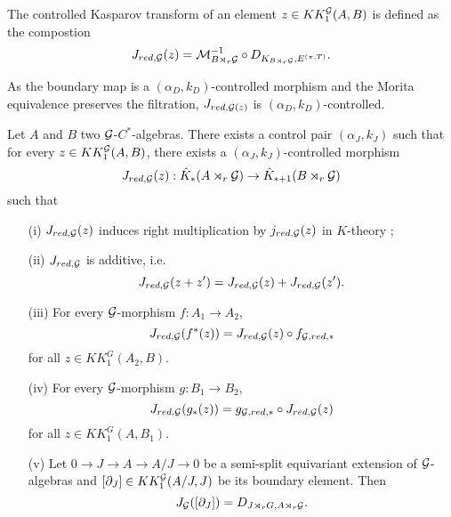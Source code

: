 \begin{definition}
The controlled Kasparov transform of an element $z\in KK_1^\mathcal G(A,B)$ is defined as the compostion
\[J_{red,\mathcal G}(z)=\mathcal M_{B\rtimes_r \mathcal G}^{-1}\circ D_{K_{B\rtimes_r \mathcal G}, E^{(\pi,T)}}.\]
\end{definition}

As the boundary map is a $(\alpha_D,k_D)$-controlled morphism and the Morita equivalence preserves the filtration, $J_{red,\mathcal G(z)}$ is  $(\alpha_D,k_D)$-controlled. 

\begin{prop}\label{Kasparov1}
Let $A$ and $B$ two $\mathcal G$-$C^*$-algebras. There exists a control pair $(\alpha_J,k_J)$ such that for every $z\in KK^\mathcal G_1(A,B)$, there exists a $(\alpha_J,k_J)$-controlled morphism
\[J_{red,\mathcal G}(z) : \hat K_*(A\rtimes_r \mathcal G)\rightarrow \hat K_{*+1}(B\rtimes_r \mathcal G)\]
such that
\begin{enumerate}
\item[(i)] $J_{red,\mathcal G}(z)$ induces right multiplication by $j_{red,\mathcal G}(z)$ in $K$-theory ;
\item[(ii)] $J_{red,\mathcal G}$ is additive, i.e.
\[J_{red,\mathcal G}(z+z')=J_{red,\mathcal G}(z)+J_{red,\mathcal G}(z').\]
\item[(iii)] For every $\mathcal G$-morphism $f : A_1\rightarrow A_2$,
\[J_{red,\mathcal G}(f^*(z))=J_{red,\mathcal G}(z)\circ f_{\mathcal G,red,*}\] for all $z\in KK_1^G(A_2,B)$.
\item[(iv)] For every $\mathcal G$-morphism $g : B_1\rightarrow B_2$,
\[J_{red,\mathcal G}(g_*(z))= g_{\mathcal G,red,*}\circ J_{red,\mathcal G}(z)\] for all $z\in KK_1^G(A,B_1)$.
\item[(v)] Let $0\rightarrow J\rightarrow A\rightarrow A/J\rightarrow 0$ be a semi-split equivariant extension of $\mathcal G$-algebras and $[\partial_J]\in KK_1^\mathcal G(A/J,J)$ be its boundary element. Then 
\[J_\mathcal G([\partial_J])=D_{J\rtimes_r G,A\rtimes_r\mathcal G}.\] 
\end{enumerate}
\end{prop}

